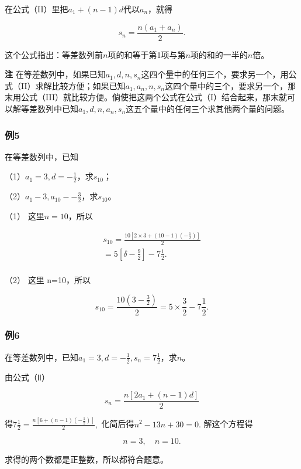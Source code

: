 在公式（II）里把\(a_1 + (n - 1)d\)代以\(a_{n}\)，就得

\[
s_{n} = \frac{n (a_{1} + a_{n})}{2}. \tag {III}
\]

这个公式指出：等差数列前\(n\)项的和等于第1项与第\(n\)项的和的一半的\(n\)倍。

\textbf{注}
在等差数列中，如果已知\(a_1, d, n, s_n\)这四个量中的任何三个，要求另一个，用公式（II）求解比较方便；如果已知\(a_1, a_n, n, s_n\)这四个量中的三个，要求另一个，那末用公式（III）就比较方便。倘使把这两个公式在公式（I）结合起来，那末就可以解等差数列中已知\(a_1, d, n, a_n, s_n\)这五个量中的任何三个求其他两个量的问题。

\subsubsection{例5}

在等差数列中，已知

（1）\(a_{1} = 3, d = -\frac{1}{2}\)，求\(s_{10}\)；

（2）\(a_{1} - 3, a_{10} - -\frac{3}{2}\)，求\(s_{10}\)。

 （1） 这里\(n = 10\)，所以

\[
\begin{array}{l} s_{10} = \frac{10 \left[ 2 \times 3 + (10 - 1) \left(- \frac{1}{2}\right) \right]}{2} \\ = 5 \left[ \delta - \frac{9}{2} \right] - 7 \frac{1}{2}. \\ \end{array}
\]

（2） 这里 n=10，所以

\[
s_{10} = \frac{10 \left(3 - \frac{3}{2}\right)}{2} = 5 \times \frac{3}{2} - 7 \frac{1}{2}.
\]

\subsubsection{例6}

在等差数列中，已知\(a_1 = 3, d = -\frac{1}{2}, s_n = 7\frac{1}{2}\)，求\(n\)。

 由公式（Ⅱ）

\[
s_{n} = \frac{n [ 2 a_{1} + (n - 1) d ]}{2}
\]

得\(7\frac{1}{2} = \frac{n\left[6 + (n - 1)\left(-\frac{1}{2}\right)\right]}{2},\)
化简后得\(n^2 - 13n + 30 = 0.\) 解这个方程得

\[
n = 3, \quad n = 10.
\]

求得的两个数都是正整数，所以都符合题意。

